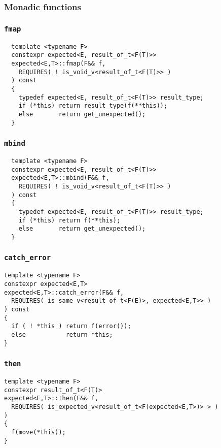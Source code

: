 \documentclass[xcolor=dvipsnames]{beamer}
\newcommand{\cpp}[1]{\lstinline{#1}}
\begin{document}
\subsubsection{Monadic functions}
\begin{frame}[fragile]
\frametitle{\cpp{fmap}}

\begin{lstlisting}
  template <typename F>
  constexpr expected<E, result_of_t<F(T)>>
  expected<E,T>::fmap(F&& f,
    REQUIRES( ! is_void_v<result_of_t<F(T)>> )
  ) const 
  {
    typedef expected<E, result_of_t<F(T)>> result_type;
    if (*this) return result_type(f(**this));
    else       return get_unexpected();
  }
\end{lstlisting}

\end{frame}
\begin{frame}[fragile]
\frametitle{\cpp{mbind}}

\begin{lstlisting}
  template <typename F>
  constexpr expected<E, result_of_t<F(T)>>
  expected<E,T>::mbind(F&& f,
    REQUIRES( ! is_void_v<result_of_t<F(T)>> )
  ) const 
  {
    typedef expected<E, result_of_t<F(T)>> result_type;
    if (*this) return f(**this);
    else       return get_unexpected();
  }
\end{lstlisting}

\end{frame}
\begin{frame}[fragile]
\frametitle{\cpp{catch_error}}

\begin{lstlisting}
template <typename F>
constexpr expected<E,T>
expected<E,T>::catch_error(F&& f,
  REQUIRES( is_same_v<result_of_t<F(E)>, expected<E,T>> ) 
) const
{
  if ( ! *this ) return f(error());
  else           return *this;
}
\end{lstlisting}

\end{frame}
\begin{frame}[fragile]
\frametitle{\cpp{then}}

\begin{lstlisting}
template <typename F>
constexpr result_of_t<F(T)>
expected<E,T>::then(F&& f,
  REQUIRES( is_expected_v<result_of_t<F(expected<E,T>)> > ) 
) 
{
  f(move(*this));
}
\end{lstlisting}

\end{frame}
\end{document}
